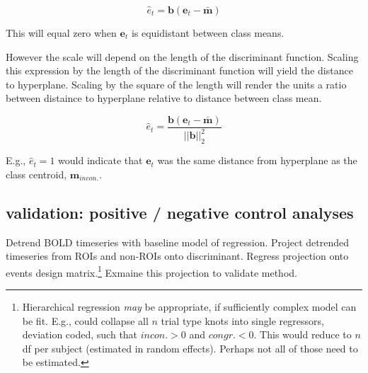 \documentclass{article}\usepackage[]{graphicx}\usepackage[]{color}
\begin{document}
\[\hat{e}_t = \mathbf{b} (\mathbf{e}_t - \mathbf{\bar{m}})\]

This will equal zero when $\mathbf{e}_t$ is equidistant between class means.

However the scale will depend on the length of the discriminant function.
Scaling this expression by the length of the discriminant function will yield the distance to hyperplane.
Scaling by the square of the length will render the units a ratio between distaince to hyperplane relative to distance between class mean.

\[
\hat{e}_t =
\frac{\mathbf{b} (\mathbf{e}_t - \mathbf{\bar{m}})}
{||\mathbf{b}||^2_2}
\]

E.g., $\hat{e}_t = 1$ would indicate that $\mathbf{e}_t$ was the same distance from hyperplane as the class centroid, $\mathbf{m}_\mathit{incon.}$.



% 
% 
% 
% 
% 
% 
% 
% 
% 

\subsection*{validation: positive / negative control analyses}

Detrend BOLD timeseries with baseline model of regression.
Project detrended timeseries from ROIs and non-ROIs onto discriminant.
Regress projection onto events design matrix.\footnote{
Hierarchical regression \textit{may} be appropriate, if sufficiently complex model can be fit.
E.g., could collapse all $n$ trial type knots into single regressors, 
deviation coded, such that $\mathit{incon.} > 0$ and $\mathit{congr.} < 0$.
This would reduce to $n$ df per subject (estimated in random effects).
Perhaps not all of those need to be estimated.
}
Exmaine this projection to validate method.
\end{document}
